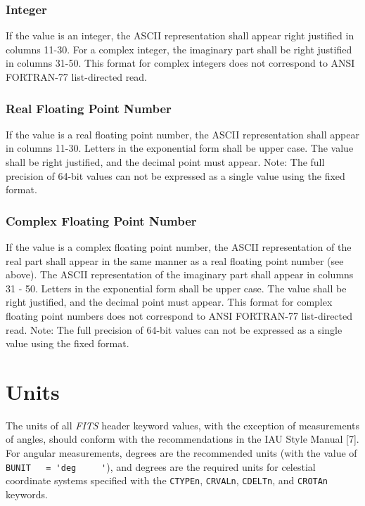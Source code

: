    \subsubsection{Integer}
   \label{s:ffi}
   If the value is an integer, the ASCII representation shall
   appear right justified in columns 11-30.  For a
   complex integer,
   the imaginary part shall be right justified in columns 31-50.
   This format for complex integers
   does not correspond to ANSI 
   FORTRAN-77
   list-directed read.
   
\subsubsection{Real Floating Point Number}
    \label{s:ffrfp}
   If the value is a real floating point number, 
   the ASCII
   representation shall appear in columns 11-30.
   Letters in the exponential form shall be upper case.
   The value shall be right justified, and the decimal point must
   appear.  Note: The full precision of 64-bit values can not
   be expressed as a single value using the fixed format. 
  
   \subsubsection{Complex Floating Point Number}
  \label{s:ffcfp}
      If the value is a complex floating point number, the ASCII
   representation of the real part shall appear 
   in the same
   manner as a real floating point number (see above). The ASCII 
   representation of the imaginary part shall appear in columns 31 - 50. 
   Letters in the exponential form shall be upper case. The value
   shall be right justified, and the decimal point must appear.
   This format for complex floating point numbers does not 
   correspond to ANSI FORTRAN-77
   list-directed read.
   Note: The full precision of 64-bit values can not
   be expressed as a single value using the fixed format. 
  
 \section{Units}
  \label{s:Units}
 The units of all {\em FITS\/} header keyword values, 
 with the exception of
 measurements of angles, should 
 conform with the recommendations in the
 IAU Style Manual
 [7]. For angular measurements,
 degrees are the
 recommended units (with the value of 
 \verb*+BUNIT   = 'deg     '+), and degrees
 are the required units for celestial 
 coordinate
 systems specified with
 the {\tt CTYPEn}, {\tt CRVALn}, 
 {\tt CDELTn}, and {\tt CROTAn} keywords. 
  
